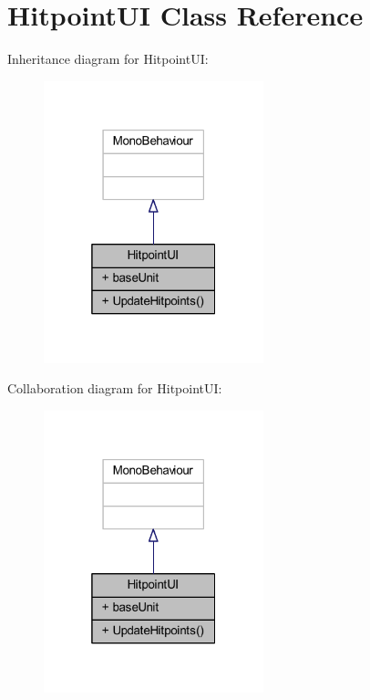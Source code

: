 \hypertarget{class_hitpoint_u_i}{}\section{Hitpoint\+UI Class Reference}
\label{class_hitpoint_u_i}


Inheritance diagram for Hitpoint\+UI\+:
\nopagebreak
\begin{figure}[H]
\begin{center}
\leavevmode
\includegraphics[width=181pt]{class_hitpoint_u_i__inherit__graph}
\end{center}
\end{figure}


Collaboration diagram for Hitpoint\+UI\+:
\nopagebreak
\begin{figure}[H]
\begin{center}
\leavevmode
\includegraphics[width=181pt]{class_hitpoint_u_i__coll__graph}
\end{center}
\end{figure}
